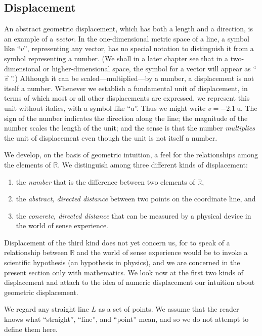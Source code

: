 \subsection{Displacement}

An abstract geometric displacement, which has both a length and a direction, is
an example of a \emph{vector}. In the one-dimensional metric space of a line, a
symbol like ``$v$'', representing any vector, has no special notation to
distinguish it from a symbol representing a number. (We shall in a later
chapter see that in a two-dimensional or higher-dimensional space, the symbol
for a vector will appear as ``$\vec{v}\:$''.) Although it can be
scaled---multiplied---by a number, a displacement is not itself a number.
Whenever we establish a fundamental unit of displacement, in terms of which
most or all other displacements are expressed, we represent this unit without
italics, with a symbol like ``$\mathrm{u}$''. Thus we might write $v =
-2.1\:\mathrm{u}$. The sign of the number indicates the direction along the
line; the magnitude of the number scales the length of the unit; and the sense
is that the number \emph{multiplies} the unit of displacement even though the
unit is not itself a number.

We develop, on the basis of geometric intuition, a feel for the relationships
among the elements of $\mathbb{R}$. We distinguish among three different kinds
of displacement:
\begin{enumerate}
   \item the \emph{number} that is the difference between two elements of
      $\mathbb{R}$,
   \item the \emph{abstract, directed distance} between two points on the
      coordinate line, and
   \item the \emph{concrete, directed distance} that can be measured by a
      physical device in the world of sense experience.
\end{enumerate}
Displacement of the third kind does not yet concern us, for to speak of a
relationship between $\mathbb{R}$ and the world of sense experience would be to
invoke a scientific hypothesis (an hypothesis in physics), and we are concerned
in the present section only with mathematics.  We look now at the first two
kinds of displacement and attach to the idea of numeric displacement our
intuition about geometric displacement.

We regard any straight line $L$ as a set of points. We assume that the reader
knows what ``straight'', ``line'', and ``point'' mean, and so we do not attempt
to define them here.

